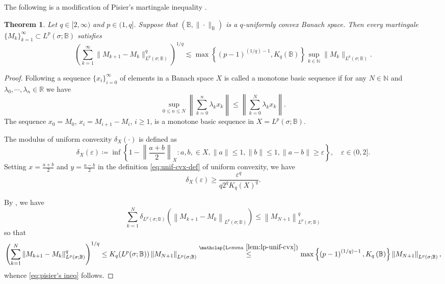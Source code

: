 \documentclass[11pt,reqno]{amsart}
\newtheorem{theorem}{Theorem}
\newcommand{\1}{\mathbf 1}
\begin{document}
The following is a modification of Pisier's martingale inequality \cite[Theorem 1.3]{pisier1975martingales}.
\begin{theorem}\label{thm:pisier inequality} Let $q\in [2,\infty)$ and $p\in (1,q]$. Suppose that $(\mathbb{B},\|\cdot\|_\mathbb{B})$ is a $q$-uniformly convex Banach space. Then every martingale $\{M_k\}_{k=1}^\infty\subset L^p(\sigma;\mathbb{B})$  satisfies
	\begin{equation}\label{eq:pisier's ineq}
		\left(\sum_{k=1}^\infty \|M_{k+1}-M_k\|_{L^p(\sigma;\mathbb{B})}^q\right)^{1/q}\lesssim \max\left\{\left(p-1\right)^{(1/q)-1},K_q\left(\mathbb{B}\right)\right\}\sup_{k\in \mathbb{N}} \|M_k\|_{L^p(\sigma;\mathbb{B})}.
	\end{equation}
\end{theorem}
\begin{proof}
Following \cite[Definition 10.8]{pisier2016martingales} a sequence $\{x_i\}_{i=0}^\infty$ of elements in a Banach space $X$ is called a monotone basic sequence if for any $N\in \mathbb{N}$ and $\lambda_0,\cdots,\lambda_n\in \mathbb{R}$ we have
\[
\sup_{0\le n\le N}\left\|\sum_{k=0}^n \lambda_kx_k\right\|\le\left\|\sum_{k=0}^N \lambda_kx_k\right\|.
\]
The sequence $x_0=M_0$, $x_i=M_{i+1}-M_i$, $i\ge 1$, is a monotone basic sequence in $X=L^p\left(\sigma;\mathbb{B}\right)$.

The modulus of uniform convexity $\delta_X(\cdot)$ is defined as
\[
\delta_X(\varepsilon)\coloneqq \inf\left\{1-\left\|\frac{a+b}{2}\right\|_{X}:a,b,\in X,\|a\|\le 1, \|b\|\le 1, \|a-b\|\ge \varepsilon\right\},\quad \varepsilon\in (0,2].
\]
Setting $x=\frac{a+b}{2}$ and $y=\frac{a-b}{2}$ in the definition \eqref{eq:unif-cvx-def} of uniform convexity, we have
\[
\delta_X(\varepsilon)\ge \frac{\varepsilon^q}{q2^qK_q(X)^q}.
\]

By \cite[Theorem 10.9, Corollary 10.10]{pisier2016martingales}, we have
\[
\sum_{k=1}^N \delta_{L^p(\sigma;\mathbb{B})}\left(\left\|M_{k+1}-M_k\right\|_{L^p(\sigma;\mathbb{B})}\right)\le \left\|M_{N+1}\right\|^q_{L^p(\sigma;\mathbb{B})}
\]
so that
\[
\left(\sum_{k=1}^N \left\|M_{k+1}-M_k\right\|_{L^p(\sigma;\mathbb{B})}^q\right)^{1/q}\le K_q(L^p(\sigma;\mathbb{B}))\left\|M_{N+1}\right\|_{L^p(\sigma;\mathbb{B})}\stackrel{\mathclap{\mathrm{Lemma~}\ref{lem:lp-unif-cvx}}}{\le} \max\left\{\left(p-1\right)^{(1/q)-1},K_q\left(\mathbb{B}\right)\right\}\left\|M_{N+1}\right\|_{L^p(\sigma;\mathbb{B})},
\]
whence \eqref{eq:pisier's ineq} follows.
\end{proof}
\end{document}
